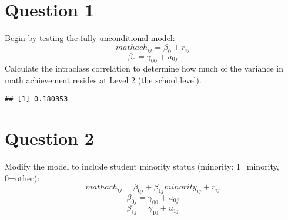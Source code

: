 \documentclass[]{article}
\newenvironment{Shaded}{\begin{snugshade}}{\end{snugshade}}
\newcommand{\KeywordTok}[1]{\textcolor[rgb]{0.13,0.29,0.53}{\textbf{#1}}}
\newcommand{\DataTypeTok}[1]{\textcolor[rgb]{0.13,0.29,0.53}{#1}}
\newcommand{\DecValTok}[1]{\textcolor[rgb]{0.00,0.00,0.81}{#1}}
\newcommand{\StringTok}[1]{\textcolor[rgb]{0.31,0.60,0.02}{#1}}
\newcommand{\ControlFlowTok}[1]{\textcolor[rgb]{0.13,0.29,0.53}{\textbf{#1}}}
\newcommand{\OperatorTok}[1]{\textcolor[rgb]{0.81,0.36,0.00}{\textbf{#1}}}
\newcommand{\NormalTok}[1]{#1}
\begin{document}
\section{Question 1}\label{question-1}

Begin by testing the fully unconditional model:
\[mathach_{ij} = \beta_0 + r_{ij}\] \[\beta_0 = \gamma_{00} + u_{0j}\]
Calculate the intraclass correlation to determine how much of the
variance in math achievement resides at Level 2 (the school level).

\begin{Shaded}
\end{Shaded}

\begin{verbatim}
## [1] 0.180353
\end{verbatim}

\section{Question 2}\label{question-2}

Modify the model to include student minority status (minority:
1=minority, 0=other):
\[mathach_{ij} = \beta_{0j} + \beta_{1j}minority_{ij} + r_{ij}\]
\[\beta_{0j} = \gamma_{00} + u_{0j}\]
\[\beta_{1j} = \gamma_{10} + u_{1j}\]
\end{document}
